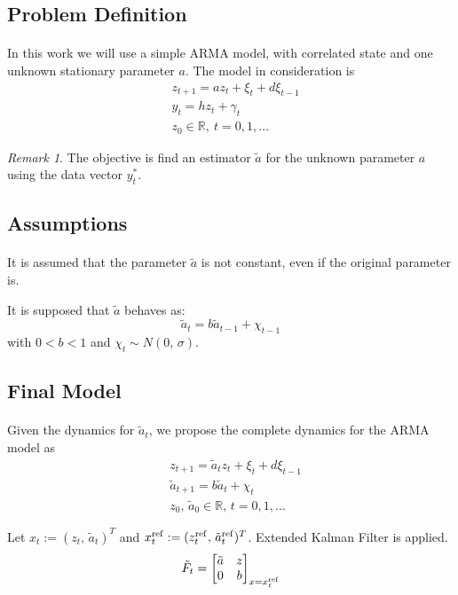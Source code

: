 \documentclass{beamer}
\theoremstyle{definition}
\theoremstyle{remark}
\newtheorem{remark}{Remark}
\theoremstyle{example}
\newif\ifinsection
\newif\ifinsubsection
\let\oldsubsection\subsection
\renewcommand{\subsection}{%
  \global\insubsectiontrue%
  \oldsubsection}
\newcommand {\aframe}[1] {%
  \begin{frame}
    \ifinsection\frametitle{\secname}\fi
    \ifinsubsection\framesubtitle{\subsecname}\fi
  #1
  \end{frame}
}
\begin{document}
\subsection{Problem Definition}
\aframe{
In this work we will use a simple ARMA model, with correlated state and one unknown stationary parameter $a$. The model in consideration is
\begin{equation}
  \begin{split}
    &z_{t+1}=az_t+\xi_t+d\xi_{t-1}\\
    &y_{t}=hz_t+\gamma_{t}\\
    &z_0\in\mathbb{R}, \ t=0,1,\dots
  \end{split}
\end{equation}
\pause
\begin{remark}
  The objective is find an estimator $\tilde{a}$ for the unknown parameter $a$ using the data vector $y^*_t$.
\end{remark}
}

\subsection{Assumptions}
\aframe{
  It is assumed that the parameter $\tilde{a}$ is not constant, even if the original parameter is. \\ \vspace{0.5cm} \pause

  It is supposed that $\tilde{a}$ behaves as:
\begin{equation}
  \tilde{a}_t=b\tilde{a}_{t-1}+\chi_{t-1}
\end{equation}
with $0<b<1$ and $\chi_t \sim N(0,\,\sigma)$.
}

\subsection{Final Model}
\aframe{
Given the dynamics for $\tilde{a}_t$, we propose the complete dynamics for the ARMA model as
\begin{equation}\label{eq:mainARMA}
  \begin{split}
    &z_{t+1}=\tilde{a}_tz_t+\xi_t+d\xi_{t-1}\\
    &\tilde{a}_{t+1}=b\tilde{a}_t+\chi_t\\
    &z_0, \, \tilde{a}_0\in\mathbb{R},\,t=0,1,\dots
  \end{split}
\end{equation} \pause

Let $x_t:=(z_t,\,\tilde{a}_t)^T$ and $x^{{\rm ref}}_t:=(z_t^{{\rm ref}},\,\tilde{a}_t^{{\rm ref}})^T$. Extended Kalman Filter is applied.
\[
\tilde{F}_t = \begin{bmatrix}
\tilde{a} & z\\
0 & b
\end{bmatrix}_{x=x_t^{{\rm ref}}}
\]
}
\end{document}
